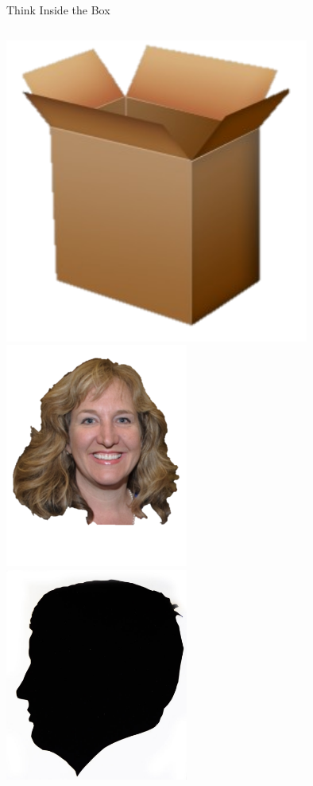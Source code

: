 \begin{frame}{Think Inside the Box}
    \begin{columns}[onlytextwidth] 
            \centering
            \includegraphics[width=0.75\textwidth]{img/box.png} \\

            \centering
            \includegraphics[width=0.45\textwidth]{img/amanda-marshall.png} \\
            \includegraphics[width=0.45\textwidth]{img/elmer-dickens.png} \\
    \end{columns}
\end{frame}

